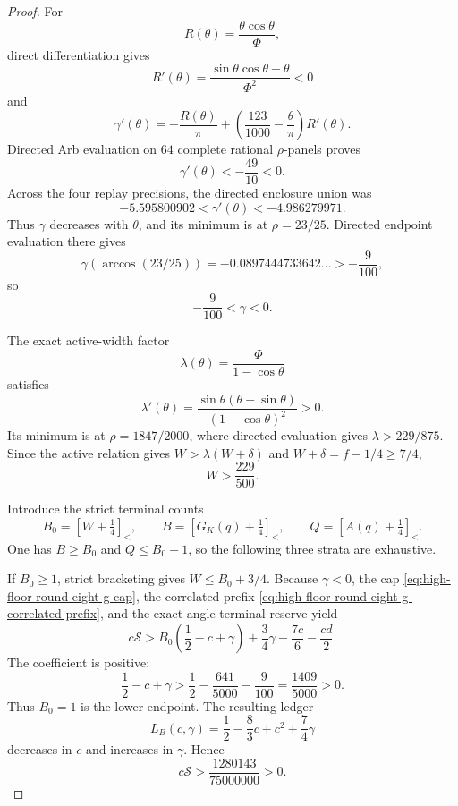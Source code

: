 \documentclass[11pt]{article}
\theoremstyle{remark}
\newcommand{\sbr}[1]{[#1]_{<}}
\begin{document}
\begin{proof}
For
\[
 R(\theta)=\frac{\theta\cos\theta}{\Phi},
\]
direct differentiation gives
\[
 R'(\theta)=
 \frac{\sin\theta\cos\theta-\theta}{\Phi^2}<0
\]
and
\begin{equation}
 \gamma'(\theta)=-\frac{R(\theta)}{\pi}
 +\left(\frac{123}{1000}-\frac{\theta}{\pi}\right)R'(\theta).
 \label{eq:high-floor-round-eight-g-gamma-derivative}
\end{equation}
Directed Arb evaluation on $64$ complete rational $\rho$-panels proves
\begin{equation}
 \boxed{\gamma'(\theta)<-\frac{49}{10}<0.}
 \label{eq:high-floor-round-eight-g-gamma-wall}
\end{equation}
Across the four replay precisions, the directed enclosure union was
\[
 -5.595800902<\gamma'(\theta)<-4.986279971.
\]
Thus $\gamma$ decreases with $\theta$, and its minimum is at
$\rho=23/25$.  Directed endpoint evaluation there gives
\[
 \gamma(\arccos(23/25))
 =-0.0897444733642\ldots>-\frac9{100},
\]
so
\begin{equation}
 \boxed{-\frac9{100}<\gamma<0.}
 \label{eq:high-floor-round-eight-g-gamma-range}
\end{equation}

The exact active-width factor
\[
 \lambda(\theta)=\frac{\Phi}{1-\cos\theta}
\]
satisfies
\[
 \lambda'(\theta)=
 \frac{\sin\theta(\theta-\sin\theta)}
 {(1-\cos\theta)^2}>0.
\]
Its minimum is at $\rho=1847/2000$, where directed evaluation gives
$\lambda>229/875$.  Since the active relation gives
$W>\lambda(W+\delta)$ and $W+\delta=f-1/4\geq7/4$,
\begin{equation}
 \boxed{W>\frac{229}{500}.}
 \label{eq:high-floor-round-eight-g-width}
\end{equation}

Introduce the strict terminal counts
\[
 B_0=\sbr{W+\tfrac14},\qquad
 B=\sbr{G_K(q)+\tfrac14},\qquad
 Q=\sbr{A(q)+\tfrac14}.
\]
One has $B\geq B_0$ and $Q\leq B_0+1$, so the following three strata
are exhaustive.

If $B_0\geq1$, strict bracketing gives $W\leq B_0+3/4$.
Because $\gamma<0$, the cap
\eqref{eq:high-floor-round-eight-g-cap}, the correlated prefix
\eqref{eq:high-floor-round-eight-g-correlated-prefix}, and the
exact-angle terminal reserve yield
\begin{equation}
 c\mathcal S>
 B_0\left(\frac12-c+\gamma\right)
 +\frac34\gamma-\frac{7c}{6}-\frac{cd}{2}.
 \label{eq:high-floor-round-eight-g-B-ledger}
\end{equation}
The coefficient is positive:
\[
 \frac12-c+\gamma>
 \frac12-\frac{641}{5000}-\frac9{100}
 =\frac{1409}{5000}>0.
\]
Thus $B_0=1$ is the lower endpoint.  The resulting ledger
\[
 L_B(c,\gamma)=\frac12-\frac83c+c^2+\frac74\gamma
\]
decreases in $c$ and increases in $\gamma$.  Hence
\begin{equation}
 \boxed{c\mathcal S>
 \frac{1280143}{75000000}>0.}
 \label{eq:high-floor-round-eight-g-B-positive}
\end{equation}


\end{proof}
\end{document}
